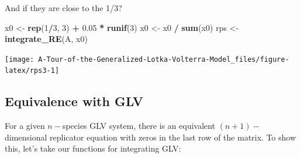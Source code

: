 \documentclass[]{book}
\newenvironment{Shaded}{\begin{snugshade}}{\end{snugshade}}
\newcommand{\DecValTok}[1]{\textcolor[rgb]{0.00,0.00,0.81}{#1}}
\newcommand{\FloatTok}[1]{\textcolor[rgb]{0.00,0.00,0.81}{#1}}
\newcommand{\KeywordTok}[1]{\textcolor[rgb]{0.13,0.29,0.53}{\textbf{#1}}}
\newcommand{\NormalTok}[1]{#1}
\newcommand{\OperatorTok}[1]{\textcolor[rgb]{0.81,0.36,0.00}{\textbf{#1}}}
\newcommand{\StringTok}[1]{\textcolor[rgb]{0.31,0.60,0.02}{#1}}
\begin{document}
And if they are close to the 1/3?

\begin{Shaded}
\begin{Highlighting}[]
\NormalTok{x0 <-}\StringTok{ }\KeywordTok{rep}\NormalTok{(}\DecValTok{1}\OperatorTok{/}\DecValTok{3}\NormalTok{, }\DecValTok{3}\NormalTok{) }\OperatorTok{+}\StringTok{ }\FloatTok{0.05} \OperatorTok{*}\StringTok{ }\KeywordTok{runif}\NormalTok{(}\DecValTok{3}\NormalTok{)}
\NormalTok{x0 <-}\StringTok{ }\NormalTok{x0 }\OperatorTok{/}\StringTok{ }\KeywordTok{sum}\NormalTok{(x0)}
\NormalTok{rps <-}\StringTok{ }\KeywordTok{integrate_RE}\NormalTok{(A, x0)}
\end{Highlighting}
\end{Shaded}

\begin{center}\texttt{[image: A-Tour-of-the-Generalized-Lotka-Volterra-Model\_files/figure-latex/rps3-1]} \end{center}

\hypertarget{equivalence-with-glv}{%
\subsection{Equivalence with GLV}\label{equivalence-with-glv}}

For a given \(n-\)species GLV system, there is an equivalent \((n+1)-\)dimensional replicator equation with zeros in the last row of the matrix. To show this, let's take our functions for integrating GLV:
\end{document}
